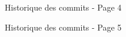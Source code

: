 \documentclass [a4 paper,11pt]{report}
\begin{document}
\begin{center}
  \begin{figure}[h!]
  \noindent{}
  \caption{Historique des commits - Page 4}
  \end{figure}

  \begin{figure}[h!]
  \noindent{}
  \caption{Historique des commits - Page 5}
  \end{figure}


\end{center}
\end{document}
